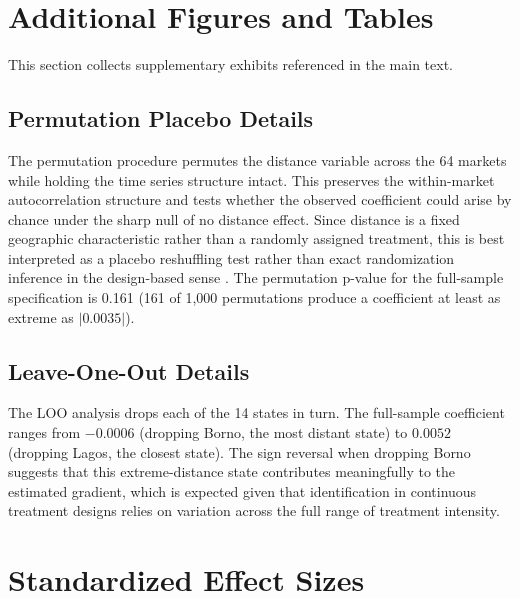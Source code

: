 \documentclass[12pt]{article}
\begin{document}
\section{Additional Figures and Tables}
\label{app:additional}

This section collects supplementary exhibits referenced in the main text.

\subsection{Permutation Placebo Details}

The permutation procedure permutes the distance variable across the 64 markets while holding the time series structure intact. This preserves the within-market autocorrelation structure and tests whether the observed coefficient could arise by chance under the sharp null of no distance effect. Since distance is a fixed geographic characteristic rather than a randomly assigned treatment, this is best interpreted as a placebo reshuffling test rather than exact randomization inference in the design-based sense \citep{Young2019}. The permutation p-value for the full-sample specification is 0.161 (161 of 1,000 permutations produce a coefficient at least as extreme as $|0.0035|$).

\subsection{Leave-One-Out Details}

The LOO analysis drops each of the 14 states in turn. The full-sample coefficient ranges from $-0.0006$ (dropping Borno, the most distant state) to $0.0052$ (dropping Lagos, the closest state). The sign reversal when dropping Borno suggests that this extreme-distance state contributes meaningfully to the estimated gradient, which is expected given that identification in continuous treatment designs relies on variation across the full range of treatment intensity.


\section{Standardized Effect Sizes}
\label{sec:sde}


\end{document}

